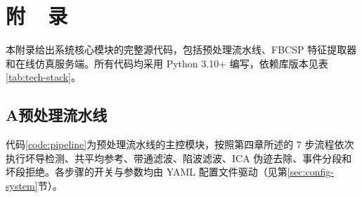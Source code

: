 \newpage
{}
{}
\section*{附~~录}
\vspace*{-2mm}
\setlength{\baselineskip}{25pt}

本附录给出系统核心模块的完整源代码，包括预处理流水线、FBCSP 特征提取器和在线仿真服务端。所有代码均采用 Python 3.10+ 编写，依赖库版本见表\ref{tab:tech-stack}。

\subsection*{A\quad 预处理流水线}

代码\ref{code:pipeline}为预处理流水线的主控模块，按照第四章所述的 7 步流程依次执行坏导检测、共平均参考、带通滤波、陷波滤波、ICA 伪迹去除、事件分段和坏段拒绝。各步骤的开关与参数均由 YAML 配置文件驱动（见第\ref{sec:config-system}节）。

